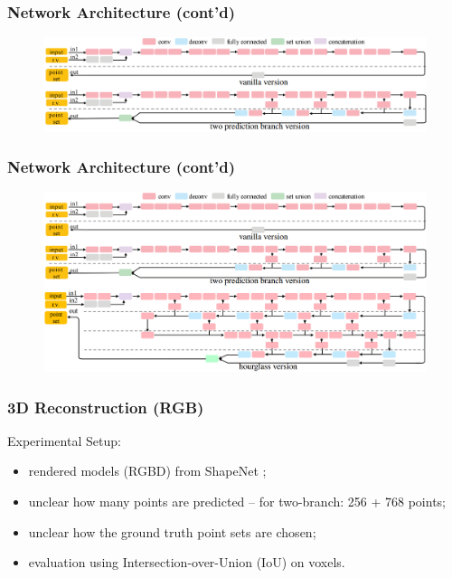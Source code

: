 \documentclass[14pt]{beamer}
\begin{document}
  \begin{frame}
    \frametitle{Network Architecture (cont'd)}
    \begin{figure}
      \centering
      \hspace*{-0.5cm}\includegraphics[scale=0.29]{architecture_2}
    \end{figure}
  \end{frame}
  
  \begin{frame}
    \frametitle{Network Architecture (cont'd)}
    \begin{figure}
      \centering
      \hspace*{-0.5cm}\includegraphics[scale=0.29]{architecture}
    \end{figure}
  \end{frame}
  
  \begin{frame}
    \frametitle{3D Reconstruction (RGB)}
    Experimental Setup:
    \begin{itemize}
      \item rendered models (RGBD) from ShapeNet \cite{Chang:2015};
      \item unclear how many points are predicted -- for two-branch: 256 + 768 points;
      \item unclear how the ground truth point sets are chosen;
      \item evaluation using Intersection-over-Union (IoU) on voxels.
    \end{itemize}
  \end{frame}
  
\end{document}

